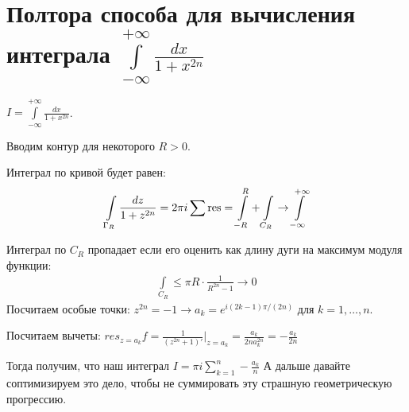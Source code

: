 \section{Полтора способа для вычисления интеграла $\int\limits_{-\infty}^{+\infty} \frac{dx}{1+x^{2n}}$}


\begin{example}
    $I = \int\limits_{-\infty}^{+\infty} \frac{dx}{1+x^{2n}}$.

    Вводим контур для некоторого $R > 0$.
 
    \begin{center}
    \end{center}
    Интеграл по кривой будет равен:
    \begin{gather*}
        \int\limits_{\Gamma_R} \frac{dz}{1+z^{2n}} = 2\pi i \sum \operatorname*{res}
        = \int\limits_{-R}^R + \int\limits_{C_R} \to \int\limits_{-\infty}^{+\infty}        
    \end{gather*}

    Интеграл по $C_R$ пропадает если его оценить
    как длину дуги на максимум модуля функции:
    \begin{gather*}
        \int\limits_{C_R} \le \pi R \cdot \frac{1}{R^{2n}-1} \to 0
    \end{gather*}
    Посчитаем особые точки: $z^{2n} = -1 \longrightarrow a_k = e^{i(2k-1)\pi / (2n)}$ для $k = 1, \ldots, n$.

    Посчитаем вычеты: $res_{z = a_k} f = \frac{1}{(z^{2n} + 1)'} \Big|_{z = a_k} = \frac{a_k}{2n a_k^{2n}} = -\frac{a_k}{2n}$
    
    Тогда получим, что наш интеграл $I = \pi i \sum \limits_{k = 1}^{n} -\frac{a_k}{n}$
    А дальше давайте соптимизируем это дело, чтобы не суммировать эту страшную геометрическую прогрессию.
\end{example}

